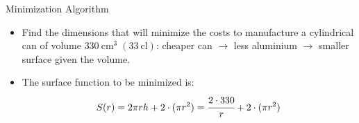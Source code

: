 \documentclass{beamer}
\begin{document}
\begin{frame}{Minimization Algorithm}
    \begin{itemize}
 	\item Find the dimensions that will minimize the costs to manufacture a cylindrical can of volume $330~\mathrm{cm}^3\;(33~\mathrm{cl})$:
   	 cheaper can $\rightarrow$ less aluminium $\rightarrow$ smaller surface given the volume.
	\item The surface function to be minimized is:
	\begin{equation*}
	S(r) = 2\pi rh + 2\cdot(\pi r^2) = \cfrac{2\cdot 330}{r} + 2\cdot(\pi r^2) 
\end{equation*}
\end{itemize}
\end{frame}
\end{document}

